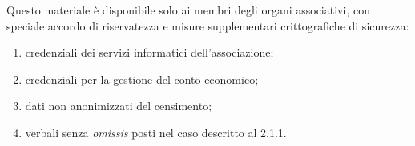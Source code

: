 Questo materiale è disponibile solo ai membri degli organi associativi,
con speciale accordo di riservatezza e misure supplementari
crittografiche di sicurezza:

\begin{enumerate}
    \item
        credenziali dei servizi informatici dell'associazione;
    \item
        credenziali per la gestione del conto economico;
    \item
        dati non anonimizzati del censimento;
    \item
        verbali senza \emph{omissis} posti nel caso descritto al 2.1.1.
\end{enumerate}

